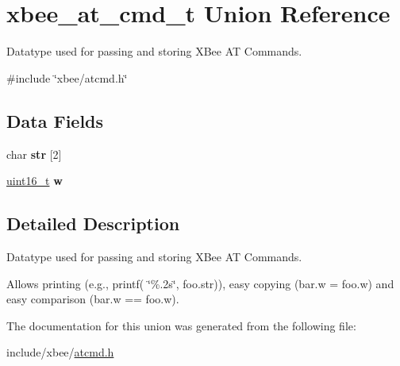 \hypertarget{unionxbee__at__cmd__t}{}\section{xbee\+\_\+at\+\_\+cmd\+\_\+t Union Reference}
\label{unionxbee__at__cmd__t}


Datatype used for passing and storing X\+Bee AT Commands.  




{\ttfamily \#include \char`\"{}xbee/atcmd.\+h\char`\"{}}

\subsection*{Data Fields}
\begin{DoxyCompactItemize}
\item 
\mbox{\label{unionxbee__at__cmd__t_a02b28928bd3f0a14b247f8a1949bfbbf}} 
char {\bfseries str} \mbox{[}2\mbox{]}
\item 
\mbox{\label{unionxbee__at__cmd__t_a69e28057d97f59f81862a467cc6299fc}} 
\hyperlink{group__hal__dos_ga5a8b2dc9e45a9ee81a94ef304fb62505}{uint16\+\_\+t} {\bfseries w}
\end{DoxyCompactItemize}


\subsection{Detailed Description}
Datatype used for passing and storing X\+Bee AT Commands. 

Allows printing (e.\+g., printf( \char`\"{}\%.\+2s\char`\"{}, foo.\+str)), easy copying (bar.\+w = foo.\+w) and easy comparison (bar.\+w == foo.\+w). 

The documentation for this union was generated from the following file\+:\begin{DoxyCompactItemize}
\item 
include/xbee/\hyperlink{atcmd_8h}{atcmd.\+h}\end{DoxyCompactItemize}
